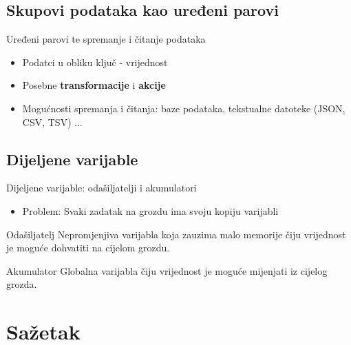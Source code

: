 \documentclass{beamer}
\begin{document}
\subsection{Skupovi podataka kao uređeni parovi}
\begin{frame}{Uređeni parovi te spremanje i čitanje podataka}
  \begin{itemize}
  \item {
 	Podatci u obliku ključ - vrijednost
 	\pause
  }
  \item {
 	Posebne \textbf{transformacije} i \textbf{akcije}
 	\pause
  }
  \item {
 	Mogućnosti spremanja i čitanja: baze podataka, tekstualne datoteke (JSON, CSV, TSV) ...
  }  
  \end{itemize}
\end{frame}
\subsection{Dijeljene varijable}
\begin{frame}{Dijeljene varijable: odašiljatelji i akumulatori}
\begin{itemize}
  \item {
 	\alert{Problem: } Svaki zadatak na grozdu ima svoju kopiju varijabli
 	\pause
  }
\end{itemize}
\begin{block}{Odašiljatelj}
	Nepromjenjiva varijabla koja zauzima malo memorije čiju vrijednost je moguće dohvatiti na cijelom grozdu.
 \end{block}  
	
  \pause
  \begin{block}{Akumulator}
	Globalna varijabla čiju vrijednost je moguće mijenjati iz cijelog grozda.
  \end{block}
 \end{frame}
  
\section*{Sažetak}
\end{document}
